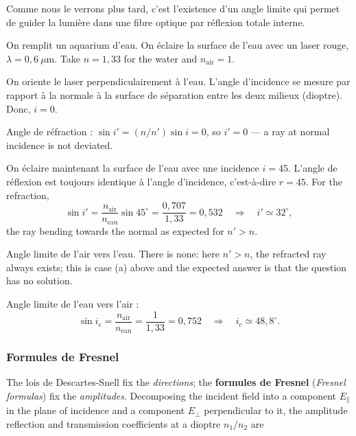 \begin{remark}
  Comme nous le verrons plus tard, c'est l'existence d'un angle limite qui permet
  de guider la lumière dans une fibre optique par réflexion totale interne.
\end{remark}

\begin{example}
  On remplit un aquarium d'eau. On éclaire la surface de l'eau avec un laser
  rouge, $\lambda = 0{,}6\ \mu$m. Take $n = 1{,}33$ for the water and
  $n_{\text{air}} = 1$.
  \begin{subpart}
    \item On oriente le laser perpendiculairement à l'eau. L'angle d'incidence se
      mesure par rapport à la normale à la surface de séparation entre les deux
      milieux (dioptre). Donc, $i = 0$\textdegree.
    \item Angle de réfraction : $\sin i' = (n/n')\sin i = 0$, so
      $i' = 0$\textdegree{} --- a ray at normal incidence is not deviated.
    \item On éclaire maintenant la surface de l'eau avec une incidence
      $i = 45$\textdegree. L'angle de réflexion est toujours identique à l'angle
      d'incidence, c'est-à-dire $r = 45$\textdegree. For the refraction,
      \[ \sin i' = \frac{n_{\text{air}}}{n_{\text{eau}}}\sin 45^{\circ}
                 = \frac{0{,}707}{1{,}33} = 0{,}532
         \quad\Longrightarrow\quad i' \simeq 32^{\circ}, \]
      the ray bending towards the normal as expected for $n' > n$.
    \item Angle limite de l'air vers l'eau. There is none: here $n' > n$, the
      refracted ray always exists; this is case (a) above and the expected answer
      is that the question has no solution.
    \item Angle limite de l'eau vers l'air :
      \[ \sin i_c = \frac{n_{\text{air}}}{n_{\text{eau}}} = \frac{1}{1{,}33}
         = 0{,}752 \quad\Longrightarrow\quad i_c \simeq 48{,}8^{\circ}. \]
  \end{subpart}
\end{example}

\subsubsection{Formules de Fresnel}

The lois de Descartes-Snell fix the \emph{directions}; the
\textbf{formules de Fresnel} (\textit{Fresnel formulas}) fix the
\emph{amplitudes}. Decomposing the incident field into a component
$E_{\parallel}$ in the plane of incidence and a component $E_{\perp}$
perpendicular to it, the amplitude reflection and transmission coefficients at a
dioptre $n_1/n_2$ are

